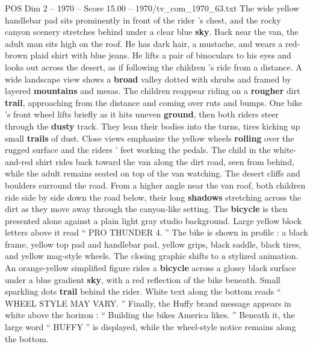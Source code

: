 \begin{textsample}{POS Dim 2 – 1970 – Score 15.00 – 1970/tv\_com\_1970\_63.txt}
The wide yellow handlebar pad sits prominently in front of the rider ’s chest, and the rocky canyon scenery stretches behind under a clear blue \textbf{sky}.
Back near the van, the adult man sits high on the roof.
He has dark hair, a mustache, and wears a red-brown plaid shirt with blue jeans.
He lifts a pair of binoculars to his eyes and looks out across the desert, as if following the children ’s ride from a distance.
A wide landscape view shows a \textbf{broad} valley dotted with shrubs and framed by layered \textbf{mountains} and mesas.
The children reappear riding on a \textbf{rougher} dirt \textbf{trail}, approaching from the distance and coming over ruts and bumps.
One bike ’s front wheel lifts briefly as it hits uneven \textbf{ground}, then both riders steer through the \textbf{dusty} track.
They lean their bodies into the turns, tires kicking up small \textbf{trails} of dust.
Close views emphasize the yellow wheels \textbf{rolling} over the rugged surface and the riders ’ feet working the pedals.
The child in the white-and-red shirt rides back toward the van along the dirt road, seen from behind, while the adult remains seated on top of the van watching.
The desert cliffs and boulders surround the road.
From a higher angle near the van roof, both children ride side by side down the road below, their long \textbf{shadows} stretching across the dirt as they move away through the canyon-like setting.
The \textbf{bicycle} is then presented alone against a plain light gray studio background.
Large yellow block letters above it read “ PRO THUNDER 4. ” The bike is shown in profile : a black frame, yellow top pad and handlebar pad, yellow grips, black saddle, black tires, and yellow mag-style wheels.
The closing graphic shifts to a stylized animation.
An orange-yellow simplified figure rides a \textbf{bicycle} across a glossy black surface under a blue gradient \textbf{sky}, with a red reflection of the bike beneath.
Small sparkling dots \textbf{trail} behind the rider.
White text along the bottom reads “ WHEEL STYLE MAY VARY. ” Finally, the Huffy brand message appears in white above the horizon : “ Building the bikes America likes. ” Beneath it, the large word “ HUFFY ” is displayed, while the wheel-style notice remains along the bottom.

\end{textsample}
